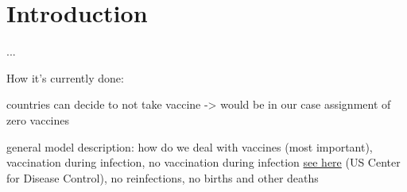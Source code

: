 \section{Introduction}
...

How it's currently done:

countries can decide to not take vaccine -> would be in our case assignment of zero vaccines

general model description: how do we deal with vaccines (most important), vaccination during infection, no vaccination during infection \href{https://www.cdc.gov/vaccines/covid-19/info-by-product/clinical-considerations.html}{see here} (US Center for Disease Control), no reinfections, no births and other deaths